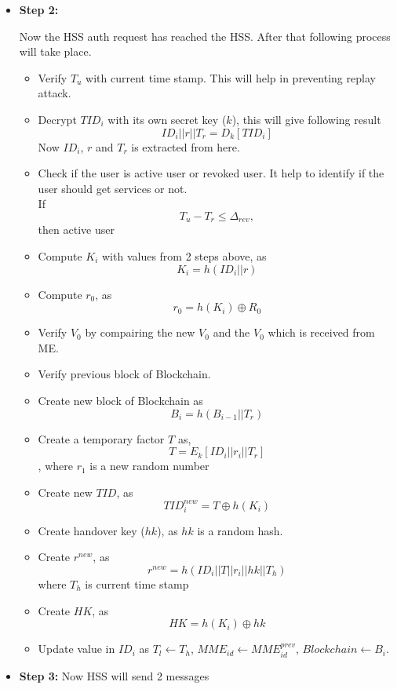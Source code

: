{\begin{itemize}
{            Here
            \begin{itemize}
                \item Type will define the type of message it is.
                \item Count will store the jumpt count between the nodes.
                \item TID, R0, V0, Tu are the values which are calculated before.
                \item Path will store the path it will follow to reach HSS
            \end{itemize}
        }
        \item \textbf{Step 2:}{
            Now the HSS auth request has reached the HSS. After that following process
            will take place.
            \begin{itemize}
                \item Verify \(T_u\) with current time stamp. This will help in preventing replay attack.
                \item Decrypt \(TID_i\) with its own secret key (\(k\)), this will give following result \[ID_i||r||T_r = D_k[TID_i]\] Now \(ID_i\), \(r\) and \(T_r\) is extracted from here.
                \item Check if the user is active user or revoked user. It help to identify if the user should get services or not.\\If \[T_u - T_r \le \Delta_{rev},\] then active user
                \item Compute \(K_i\) with values from 2 steps above, as \[K_i = h(ID_i||r)\]
                \item Compute \(r_0\), as \[r_0 = h(K_i) \oplus R_0\]
                \item Verify \(V_0\) by compairing the new \(V_0\) and the \(V_0\) which is received from ME.
                \item Verify previous block of Blockchain.
                \item Create new block of Blockchain as \[B_i = h(B_{i-1}||T_r)\]
                \item Create a temporary factor \(T\) as, \[T = E_k[ID_i||r_i||T_r]\], where \(r_1\) is a new random number
                \item Create new \(TID\), as \[TID_i^{new} = T \oplus h(K_i)\] 
                \item Create handover key (\(hk\)), as \(hk\) is a random hash.
                \item Create \(r^{new}\), as \[r^{new}= h(ID_i||T||r_i||hk||T_h)\] where \(T_h\) is current time stamp
                \item Create \(HK\), as \[HK = h(K_i) \oplus hk \]
                \item Update value in \(ID_i\) as \(T_l \leftarrow T_h\), \(MME_{id} \leftarrow MME_{id}^{prev}\), \(Blockchain \leftarrow B_i\).
            \end{itemize}
        }
        \item \textbf{Step 3:}{
            Now HSS will send 2 messages \\
}
\end{itemize}}
